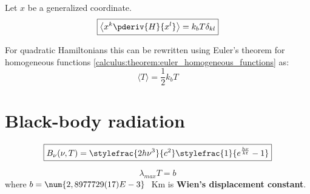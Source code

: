 	\begin{theorem}
		Let $x$ be a generalized coordinate.
		\begin{equation}
			\boxed{\left\langle x^k\pderiv{H}{x^l} \right\rangle = k_bT\delta_{kl}}
		\end{equation}
	\end{theorem}
	\begin{result}
		For quadratic Hamiltonians this can be rewritten using Euler's theorem for homogeneous functions \ref{calculus:theorem:euler_homogeneous_functions} as:
		\begin{equation}
			\langle T \rangle = \frac{1}{2}k_bT
		\end{equation}
	\end{result}
	
\section{Black-body radiation}
	\begin{formula}
		\begin{equation}
			\label{photon:plancks_law_frequency}
            \boxed{B_\nu(\nu, T) = \stylefrac{2h\nu^3}{c^2}\stylefrac{1}{e^{\frac{h\nu}{kt}} - 1}}
		\end{equation}
	\end{formula}
    
	\begin{formula}
		\begin{equation}
			\label{photon:wiens_displacement_law}
			\boxed{\lambda_{max}T = b}
		\end{equation}
		where $b = \num{2,8977729(17)E-3}\ $ Km is \textbf{Wien's displacement constant}.
	\end{formula}
